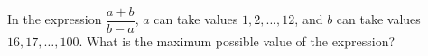 In the expression $\dfrac{a+b}{b-a}$, $a$ can take values $1, 2, \ldots, 12$, and $b$ can take values $16, 17, \ldots, 100$. What is the maximum possible value of the expression?
